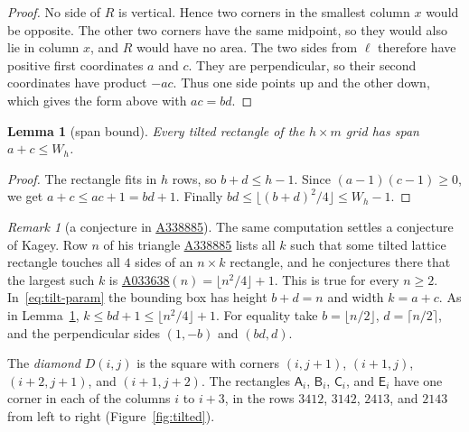 \documentclass[12pt]{article}
\theoremstyle{plain}
\newtheorem{lemma}[theorem]{Lemma}
\theoremstyle{definition}
\theoremstyle{remark}
\newtheorem{remark}[theorem]{Remark}
\newcommand{\seqnum}[1]{\href{https://oeis.org/#1}{\rm \underline{#1}}}
\newcommand{\kA}{\mathsf{A}}
\newcommand{\kB}{\mathsf{B}}
\newcommand{\kC}{\mathsf{C}}
\newcommand{\kE}{\mathsf{E}}
\begin{document}
\begin{proof}
No side of $R$ is vertical. Hence two corners in the smallest column $x$ would
be opposite. The other two corners have the same midpoint, so they would also
lie in column $x$, and $R$ would have no area. The two sides from
$\ell$ therefore have positive first coordinates $a$ and $c$. They are
perpendicular, so their second coordinates have product $-ac$. Thus one
side points up and the other down, which gives the form above with $ac=bd$.
\end{proof}

\begin{lemma}[span bound]\label{lem:span}
Every tilted rectangle of the $h\times m$ grid has span $a+c\le W_h$.
\end{lemma}

\begin{proof}
The rectangle fits in $h$ rows, so $b+d\le h-1$. Since $(a-1)(c-1)\ge0$, we get
$a+c\le ac+1=bd+1$. Finally $bd\le\lfloor(b+d)^2/4\rfloor\le W_h-1$.
\end{proof}

\begin{remark}[a conjecture in \seqnum{A338885}]\label{cor:oeisconj}
The same computation settles a conjecture of Kagey. Row $n$ of his triangle
\seqnum{A338885} lists all $k$ such that some tilted lattice rectangle touches
all $4$ sides of an $n\times k$ rectangle, and he conjectures there that the
largest such $k$ is \seqnum{A033638}$(n)=\lfloor n^2/4\rfloor+1$. This is true
for every $n\ge2$. In~\eqref{eq:tilt-param} the bounding box has height $b+d=n$
and width $k=a+c$. As in Lemma~\ref{lem:span}, $k\le bd+1\le\lfloor n^2/4\rfloor+1$.
For equality take $b=\lfloor n/2\rfloor$, $d=\lceil n/2\rceil$, and the
perpendicular sides $(1,-b)$ and $(bd,d)$.
\end{remark}

The \emph{diamond} $D(i,j)$ is the square with corners $(i,j+1)$, $(i+1,j)$,
$(i+2,j+1)$, and $(i+1,j+2)$. The rectangles $\kA_i$, $\kB_i$, $\kC_i$, and
$\kE_i$ have one corner in each of the columns $i$ to $i+3$, in the rows
$3412$, $3142$, $2413$, and $2143$ from left to right (Figure~\ref{fig:tilted}).
\end{document}
